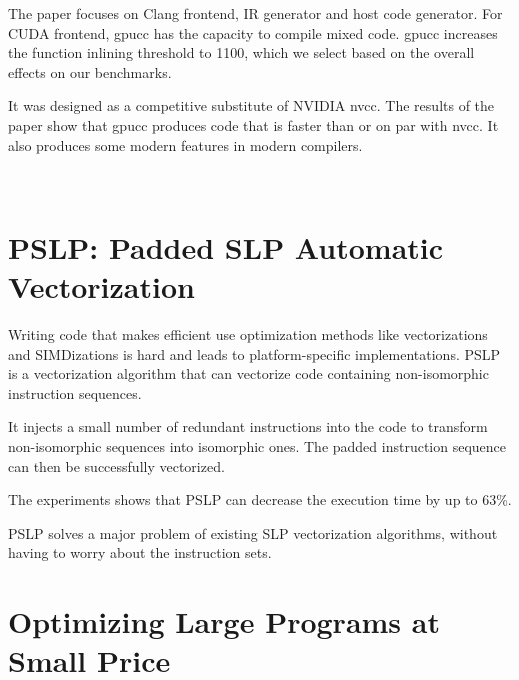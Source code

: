 \documentclass[11pt]{article}
\begin{document}
The paper focuses on Clang frontend, IR generator and host code generator. 
 For CUDA frontend, gpucc has the capacity to  compile mixed code. gpucc increases 
the function inlining threshold to 1100, which we select based on the overall 
effects on our benchmarks. 


It was designed as a competitive substitute of NVIDIA nvcc. The results of the paper
 show that gpucc produces code that is faster than or on par with nvcc. 
It also produces some modern features in modern compilers.

\begin{figure}
\centering
\subfloat[{$\ N = 100$}]{
  \texttt{[image: p100]}
}
\subfloat[{$\ N = 1000$}]{
  \texttt{[image: p1000]}
}
\subfloat[$\ $Riferimento]{
  \texttt{[image: p]}
} \\
\vspace{-0.4cm}
\subfloat[{$\ N = 100$}]{
  \texttt{[image: gj100]}
} 
\subfloat[{$\ N = 1000$}]{
  \texttt{[image: gj1000]}
} 
\subfloat[$\ $Riferimento]{
  \texttt{[image: gj]}
} 
\vspace{-0.2cm}

\end{figure}



\section{PSLP: Padded SLP Automatic Vectorization}
\label{sec:orgheadline4}

Writing code that makes efficient use optimization methods like vectorizations and SIMDizations
is hard and leads to platform-specific implementations. PSLP is a vectorization algorithm that can vectorize
code containing non-isomorphic instruction sequences.

 It injects a small number of redundant instructions into
the code to transform non-isomorphic sequences into isomorphic
ones. The padded instruction sequence can then be successfully vectorized.

The experiments shows that PSLP can decrease the execution time by up to 63\%.


PSLP solves a major problem of existing SLP vectorization
algorithms, without having to worry about the instruction sets.

\section{Optimizing Large Programs at Small Price}
\label{sec:orgheadline5}
\end{document}
